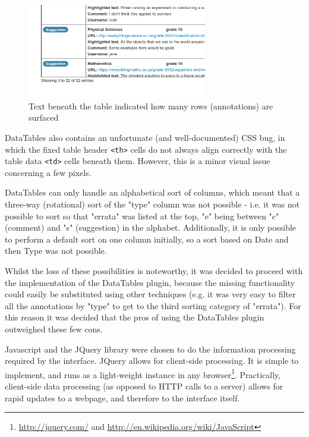 \begin{figure}[h!]
    \centering
    \includegraphics[width=0.7\textwidth]{Figures/V1/breadcrumbs.png}
 \caption{Text beneath the table indicated how many rows (annotations) are surfaced}
 \label{fig:breadcrumbs}
\end{figure}

DataTables also contains an unfortunate (and well-documented) CSS bug, in which the fixed table header \verb|<th>|                                                                                                                cells do not always align correctly with the table data \verb|<td>| cells beneath them. However, this is a minor visual issue concerning a few pixels.

DataTables can only handle an alphabetical sort of columns, which meant that a three-way (rotational) sort of the "type" column was not possible - i.e. it was not possible to sort so that "errata" was listed at the top, "e" being between "c" (comment) and "s" (suggestion) in the alphabet. Additionally, it is only possible to perform a default sort on one column initially, so a sort based on Date and then Type was not possible.

Whilst the loss of these possibilities is noteworthy, it was decided to proceed with the implementation of the DataTables plugin, because the missing functionality could easily be substituted using other techniques (e.g. it was very easy to filter all the annotations by "type" to get to the third sorting category of "errata"). For this reason it was decided that the pros of using the DataTables plugin outweighed these few cons.

Javascript and the JQuery library were chosen to do the information processing required by the interface. JQuery allows for client-side processing. It is simple to implement, and runs as a light-weight instance in any browser\footnote{\href{http://jquery.com/}{http://jquery.com/} and \href{http://en.wikipedia.org/wiki/JavaScript}{http://en.wikipedia.org/wiki/JavaScript}}. Practically, client-side data processing (as opposed to HTTP calls to a server) allows for rapid updates to a webpage, and therefore to the interface itself. 

